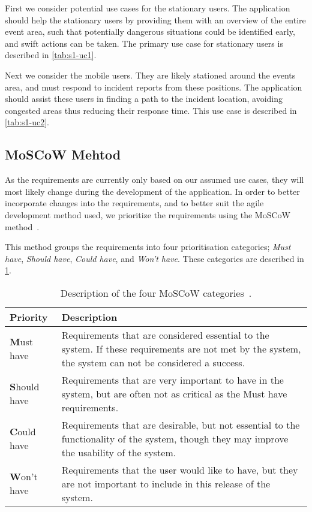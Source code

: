 First we consider potential use cases for the stationary users. The application should help the stationary users by providing them with an overview of the entire event area, such that potentially dangerous situations could be identified early, and swift actions can be taken. The primary use case for stationary users is described in \cref{tab:s1-uc1}.



Next we consider the mobile users. They are likely stationed around the events area, and must respond to incident reports from these positions. The application should assist these users in finding a path to the incident location, avoiding congested areas thus reducing their response time. This use case is described in \cref{tab:s1-uc2}.



\subsection{MoSCoW Mehtod} \label{ss:s1_moscow}
As the requirements are currently only based on our assumed use cases, they will most likely change during the development of the application. In order to better incorporate changes into the requirements, and to better suit the agile development method used, we prioritize the requirements using the MoSCoW method~\cite{moscow}.

This method groups the requirements into four prioritisation categories; \emph{Must have}, \emph{Should have}, \emph{Could have}, and \emph{Won't have}. These categories are described in \cref{tab:moscow}.

\begin{table}[h!]
	\centering
	\begin{tabularx}{\textwidth}{lX}
		\toprule
		\textbf{Priority} & \textbf{Description} \\
		\midrule
		\rowcolor[HTML]{EFEFEF} 
		\textbf{M}ust have & Requirements that are considered essential to the system. If these requirements are not met by the system, the system can not be considered a success. \\
		\textbf{S}hould have & Requirements that are very important to have in the system, but are often not as critical as the Must have requirements. \\
		\rowcolor[HTML]{EFEFEF} 
		\textbf{C}ould have & Requirements that are desirable, but not essential to the functionality of the system, though they may improve the usability of the system. \\
		\textbf{W}on't have & Requirements that the user would like to have, but they are not important to include in this release of the system. \\
		\bottomrule
	\end{tabularx}
	\caption{Description of the four MoSCoW categories~\cite{moscow}.}
	\label{tab:moscow}
\end{table}

